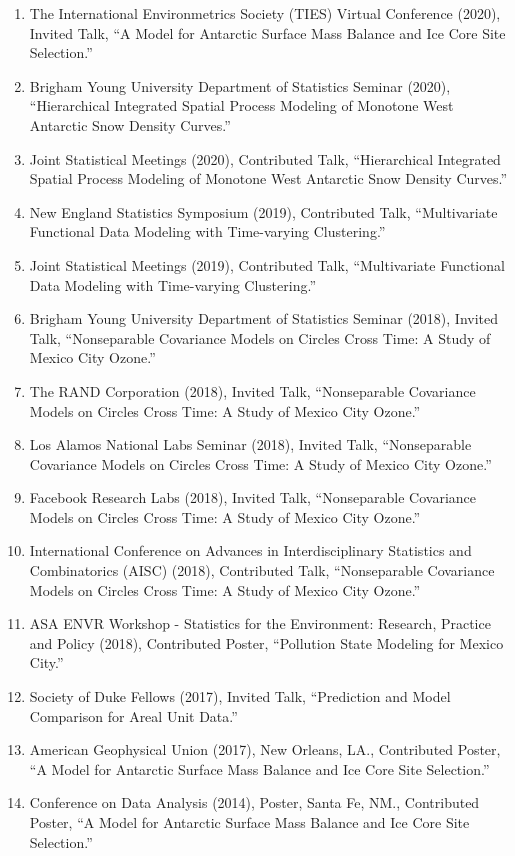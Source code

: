 \documentclass[12pt]{article}
\begin{document}
\begin{enumerate}[label=$\bullet$]
\item The International Environmetrics Society (TIES) Virtual Conference (2020), Invited Talk, ``A Model for Antarctic Surface Mass Balance and Ice Core Site Selection.''
\item Brigham Young University Department of Statistics Seminar (2020), ``Hierarchical Integrated Spatial Process Modeling of Monotone West Antarctic Snow Density Curves.''
\item Joint Statistical Meetings (2020), Contributed Talk, ``Hierarchical Integrated Spatial Process Modeling of Monotone West Antarctic Snow Density Curves.''

\item New England Statistics Symposium (2019), Contributed Talk, ``Multivariate Functional Data Modeling with Time-varying Clustering.''
\item Joint Statistical Meetings (2019), Contributed Talk, ``Multivariate Functional Data Modeling with Time-varying Clustering.''

\item Brigham Young University Department of Statistics Seminar (2018), Invited Talk, ``Nonseparable Covariance Models on Circles Cross Time: A Study of Mexico City Ozone.''
\item The RAND Corporation (2018), Invited Talk, ``Nonseparable Covariance Models on Circles Cross Time: A Study of Mexico City Ozone.''
\item Los Alamos National Labs Seminar (2018), Invited Talk, ``Nonseparable Covariance Models on Circles Cross Time: A Study of Mexico City Ozone.''
\item Facebook Research Labs (2018), Invited Talk, ``Nonseparable Covariance Models on Circles Cross Time: A Study of Mexico City Ozone.''
\item International Conference on Advances in Interdisciplinary Statistics and Combinatorics (AISC) (2018), Contributed Talk, ``Nonseparable Covariance Models on Circles Cross Time: A Study of Mexico City Ozone.''
\item ASA ENVR Workshop - Statistics for the Environment: Research, Practice and Policy (2018), Contributed Poster, ``Pollution State Modeling for Mexico City.''
\item Society of Duke Fellows (2017), Invited Talk, ``Prediction and Model Comparison for Areal Unit Data.''
\item American Geophysical Union (2017), New Orleans, LA., Contributed Poster, ``A Model for Antarctic Surface Mass Balance and Ice Core Site Selection.'' 
\item Conference on Data Analysis (2014), Poster, Santa Fe, NM., Contributed Poster, ``A Model for Antarctic Surface Mass Balance and Ice Core Site Selection.'' 



\end{enumerate}
\end{document}
